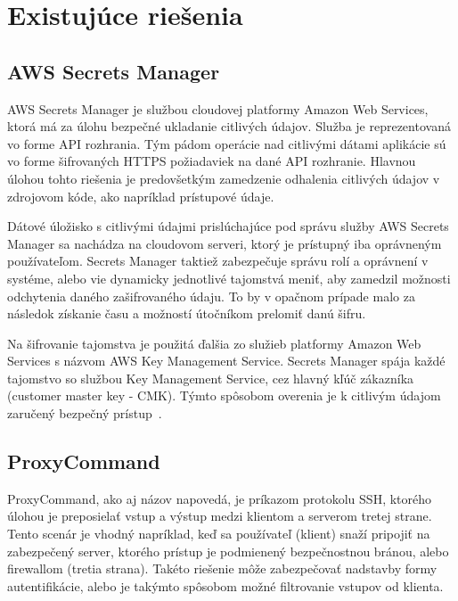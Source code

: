 \section{Existujúce riešenia}\label{sec:existujuce-riesenia}

\subsection{AWS Secrets Manager}\label{subsec:aws-secrets-manager}

AWS Secrets Manager je službou cloudovej platformy Amazon Web Services, ktorá má za úlohu bezpečné ukladanie citlivých údajov.
Služba je reprezentovaná vo forme API rozhrania.
Tým pádom operácie nad citlivými dátami aplikácie sú vo forme šifrovaných HTTPS požiadaviek na dané API rozhranie.
Hlavnou úlohou tohto riešenia je predovšetkým zamedzenie odhalenia citlivých údajov v zdrojovom kóde, ako napríklad prístupové údaje.

Dátové úložisko s citlivými údajmi prislúchajúce pod správu služby AWS Secrets Manager sa nachádza na cloudovom serveri, ktorý
je prístupný iba oprávneným používateľom.
Secrets Manager taktiež zabezpečuje správu rolí a oprávnení v systéme, alebo vie dynamicky jednotlivé tajomstvá meniť, aby
zamedzil možnosti odchytenia daného zašifrovaného údaju.
To by v opačnom prípade malo za následok získanie času a možností útočníkom prelomiť danú šifru.

Na šifrovanie tajomstva je použitá ďalšia zo služieb platformy Amazon Web Services s názvom AWS Key Management Service.
Secrets Manager spája každé tajomstvo so službou Key Management Service, cez hlavný kľúč zákazníka (customer master key - CMK).
Týmto spôsobom overenia je k citlivým údajom zaručený bezpečný prístup~\cite{SecretsManager}.

\subsection{ProxyCommand}\label{subsec:proxy-command}

ProxyCommand, ako aj názov napovedá, je príkazom protokolu SSH, ktorého úlohou je preposielať vstup a výstup medzi klientom
a serverom tretej strane.
Tento scenár je vhodný napríklad, keď sa používateľ (klient) snaží pripojiť na zabezpečený server, ktorého
prístup je podmienený bezpečnostnou bránou, alebo firewallom (tretia strana).
Takéto riešenie môže zabezpečovať nadstavby formy autentifikácie, alebo je takýmto spôsobom možné filtrovanie vstupov od klienta.

